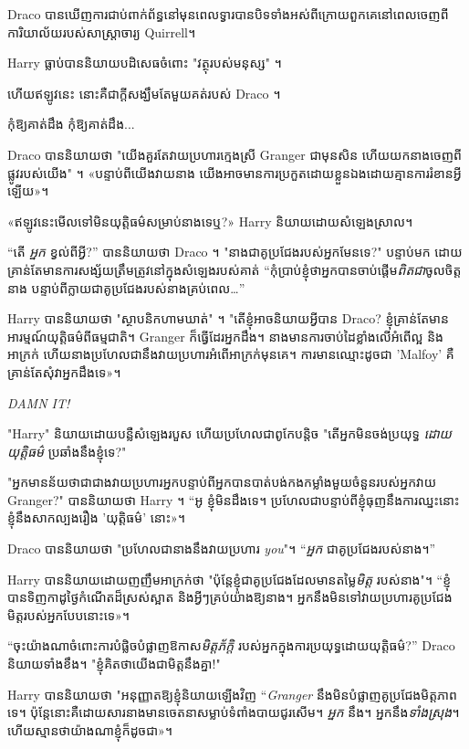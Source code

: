 {\later

Draco បាន​ឃើញ​ការ​ជាប់​ពាក់ព័ន្ធ​នៅ​មុន​ពេល​ទ្វារ​បាន​បិទ​ទាំង​អស់​ពី​ក្រោយ​ពួកគេ​នៅ​ពេល​ចេញ​ពី​ការិយាល័យ​របស់​សាស្ត្រាចារ្យ Quirrell។

Harry ធ្លាប់បាននិយាយបដិសេធចំពោះ "វត្ថុរបស់មនុស្ស" ។

ហើយឥឡូវនេះ នោះគឺជាក្តីសង្ឃឹមតែមួយគត់របស់ Draco ។

កុំឱ្យគាត់ដឹង កុំឱ្យគាត់ដឹង...

Draco បាននិយាយថា "យើងគួរតែវាយប្រហារក្មេងស្រី Granger ជាមុនសិន ហើយយកនាងចេញពីផ្លូវរបស់យើង" ។ «​បន្ទាប់​ពី​យើង​វាយ​នាង យើង​អាច​មាន​ការ​ប្រកួត​ដោយ​ខ្លួន​ឯង​ដោយ​គ្មាន​ការ​រំខាន​អ្វី​ឡើយ»។

«ឥឡូវ​នេះ​មើល​ទៅ​មិន​យុត្តិធម៌​សម្រាប់​នាង​ទេ​ឬ?» Harry និយាយដោយសំឡេងស្រាល។

“តើ \emph{អ្នក} ខ្វល់ពីអ្វី?” បាននិយាយថា Draco ។ "នាងជាគូប្រជែងរបស់អ្នកមែនទេ?" បន្ទាប់មក ដោយគ្រាន់តែមានការសង្ស័យត្រឹមត្រូវនៅក្នុងសំឡេងរបស់គាត់ “កុំប្រាប់ខ្ញុំថាអ្នកបានចាប់ផ្តើម\emph{ពិតជា}ចូលចិត្តនាង បន្ទាប់ពីក្លាយជាគូប្រជែងរបស់នាងគ្រប់ពេល…”

Harry បាននិយាយថា "ស្ថាបនិកហាមឃាត់" ។ "តើខ្ញុំអាចនិយាយអ្វីបាន Draco? ខ្ញុំ​គ្រាន់​តែ​មាន​អារម្មណ៍​យុត្តិធម៌​ពី​ធម្មជាតិ។ Granger ក៏​ធ្វើ​ដែរ​អ្នក​ដឹង។ នាង​មាន​ការ​ចាប់​ដៃ​ខ្លាំង​លើ​អំពើ​ល្អ និង​អាក្រក់ ហើយ​នាង​ប្រហែល​ជា​នឹង​វាយ​ប្រហារ​អំពើ​អាក្រក់​មុន​គេ។ ការ​មាន​ឈ្មោះ​ដូច​ជា 'Malfoy' គឺ​គ្រាន់​តែ​សុំ​វា​អ្នក​ដឹង​ទេ​»។

\emph{DAMN IT!}

"Harry" និយាយដោយបន្លឺសំឡេងរបួស ហើយប្រហែលជាពូកែបន្តិច "តើអ្នកមិនចង់ប្រយុទ្ធ \emph{ដោយយុត្តិធម៌} ប្រឆាំងនឹងខ្ញុំទេ?"

"អ្នកមានន័យថាជាជាងវាយប្រហារអ្នកបន្ទាប់ពីអ្នកបានបាត់បង់កងកម្លាំងមួយចំនួនរបស់អ្នកវាយ Granger?" បាននិយាយថា Harry ។ “អូ ខ្ញុំមិនដឹងទេ។ ប្រហែល​ជា​បន្ទាប់​ពី​ខ្ញុំ​ធុញ​នឹង​ការ​ឈ្នះ​នោះ ខ្ញុំ​នឹង​សាកល្បង​រឿង 'យុត្តិធម៌' នោះ»។

Draco បាននិយាយថា "ប្រហែលជានាងនឹងវាយប្រហារ \emph{you}"។ “\emph{អ្នក} ជាគូប្រជែងរបស់នាង។”

Harry បាននិយាយដោយញញឹមអាក្រក់ថា "ប៉ុន្តែខ្ញុំជាគូប្រជែងដែលមានតម្លៃ\emph{មិត្ត} របស់នាង"។ “ខ្ញុំបានទិញកាដូថ្ងៃកំណើតដ៏ស្រស់ស្អាត និងអ្វីៗគ្រប់យ៉ាងឱ្យនាង។ អ្នក​នឹង​មិន​ទៅ​វាយ​ប្រហារ​គូ​ប្រជែង​មិត្ត​របស់​អ្នក​បែប​នោះ​ទេ»។

“ចុះយ៉ាងណាចំពោះការបំផ្លិចបំផ្លាញឱកាស\emph{មិត្តភ័ក្តិ} របស់អ្នកក្នុងការប្រយុទ្ធដោយយុត្តិធម៌?” Draco និយាយទាំងខឹង។ "ខ្ញុំគិតថាយើងជាមិត្តនឹងគ្នា!"

Harry បាននិយាយថា "អនុញ្ញាតឱ្យខ្ញុំនិយាយឡើងវិញ “\emph{Granger} នឹងមិនបំផ្លាញគូប្រជែងមិត្តភាពទេ។ ប៉ុន្តែ​នោះ​គឺ​ដោយសារ​នាង​មាន​ចេតនា​សម្លាប់​ទំពាំង​បាយជូរ​សើម។ \emph{អ្នក} នឹង។ អ្នកនឹង\emph{ទាំងស្រុង}។ ហើយ​ស្មាន​ថា​យ៉ាង​ណា​ខ្ញុំ​ក៏​ដូច​ជា»។

}
